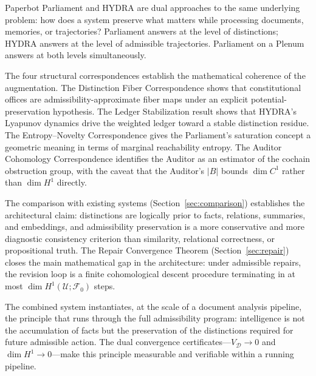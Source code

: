 \documentclass[12pt, a4paper]{article}
\theoremstyle{plain}
\theoremstyle{definition}
\theoremstyle{remark}
\begin{document}
Paperbot Parliament and HYDRA are dual approaches to the same underlying problem: how does a system preserve what matters while processing documents, memories, or trajectories? Parliament answers at the level of distinctions; HYDRA answers at the level of admissible trajectories. Parliament on a Plenum answers at both levels simultaneously.

The four structural correspondences establish the mathematical coherence of the augmentation. The Distinction Fiber Correspondence shows that constitutional offices are admissibility-approximate fiber maps under an explicit potential-preservation hypothesis. The Ledger Stabilization result shows that HYDRA's Lyapunov dynamics drive the weighted ledger toward a stable distinction residue. The Entropy--Novelty Correspondence gives the Parliament's saturation concept a geometric meaning in terms of marginal reachability entropy. The Auditor Cohomology Correspondence identifies the Auditor as an estimator of the cochain obstruction group, with the caveat that the Auditor's $|B|$ bounds $\dim C^1$ rather than $\dim H^1$ directly.

The comparison with existing systems (Section~\ref{sec:comparison}) establishes the architectural claim: distinctions are logically prior to facts, relations, summaries, and embeddings, and admissibility preservation is a more conservative and more diagnostic consistency criterion than similarity, relational correctness, or propositional truth. The Repair Convergence Theorem (Section~\ref{sec:repair}) closes the main mathematical gap in the architecture: under admissible repairs, the revision loop is a finite cohomological descent procedure terminating in at most $\dim H^1(\mathcal{U}; \mathcal{F}_0)$ steps.

The combined system instantiates, at the scale of a document analysis pipeline, the principle that runs through the full admissibility program: intelligence is not the accumulation of facts but the preservation of the distinctions required for future admissible action. The dual convergence certificates---$V_\mathcal{D} \to 0$ and $\dim H^1 \to 0$---make this principle measurable and verifiable within a running pipeline.

\bigskip
\end{document}
